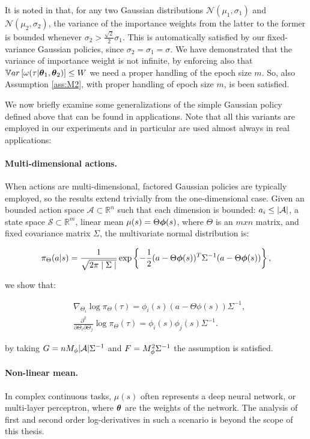 It is noted in \cite{cortes2010learning} that, for any two Gaussian distributions $\mathcal{N}(\mu_1,\sigma_1)$ and $\mathcal{N}(\mu_2,\sigma_2)$, the variance of the importance weights from the latter to the former is bounded whenever $\sigma_2 > \frac{\sqrt{2}}{2}\sigma_1$. This is automatically satisfied by our fixed-variance Gaussian policies, since $\sigma_2=\sigma_1=\sigma$.
We have demonstrated that the variance of importance weight is not infinite, by enforcing also that
$\mathbb{V}ar\left[\omega(\tau| \boldsymbol{\theta}_1, \boldsymbol{\theta}_2)\right] \leq W$ we need a proper handling of the epoch size $m$.
So, also Assumption \ref{ass:M2}, with proper handling of epoch size $m$, is been satisfied.


We now briefly examine some generalizations of the simple Gaussian policy defined above that can be found in applications. Note that all this variants are employed in our experiments and in particular are used almost always in real applications:

\paragraph{Multi-dimensional actions.}
When actions are \newline multi-dimensional, factored Gaussian policies are typically employed, so the results extend trivially from the one-dimensional case. 
Given an bounded action space $\mathcal{A}\subset\mathbb{R}^n$ such that each dimension is bounded: $a_i\leq|\mathcal{A}|$, a state space $\mathcal{S}\subset\mathbb{R}^m$, linear mean $\mu(s) = \Theta\boldsymbol{\phi}(s)$, where $\Theta$  is an $mxn$ matrix, and fixed covariance matrix $\Sigma$, the multivariate normal distribution is:

\[
\pi_{\Theta}(a\vert s) = \frac{1}{\sqrt{2\pi\mid\Sigma\mid}}\exp\left\{
-\frac{1}{2}(a - \Theta\boldsymbol{\phi}(s))^T\Sigma^{-1}(a - \Theta\boldsymbol{\phi}(s))\right\},
\]

we show that:

\begin{align*}
&\nabla_{\Theta_i}\log\pi_{\Theta}(\tau) =  \phi_i(s)(a-\Theta\phi(s))\Sigma^{-1},\\
&\frac{\partial^2}{\partial\Theta_i\partial\Theta_j}\log\pi_{\Theta}(\tau) = \phi_i(s)\phi_j(s)\Sigma^{-1}.
\end{align*}

by taking $G = nM_{\phi}|\mathcal{A}|\Sigma^{-1}$ and $F = M_{\phi}^2\Sigma^{-1}$ the assumption is satisfied.

\paragraph{Non-linear mean.}
In complex continuous tasks, $\mu(s)$ often represents a deep neural network, or multi-layer perceptron, where $\boldsymbol{\theta}$ are the weights of the network. The analysis of first and second order log-derivatives in such a scenario is beyond the scope of this thesis.


